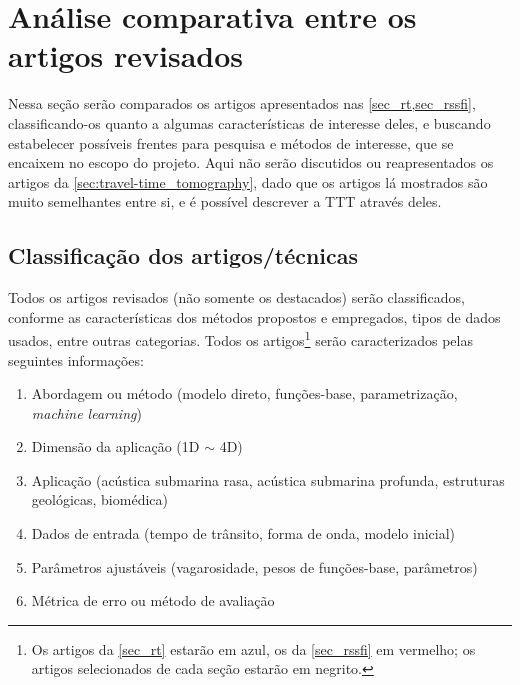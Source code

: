 \section{Análise comparativa entre os artigos revisados}
\label{sec:cp}

Nessa seção serão comparados os artigos apresentados nas \cref{sec_rt,sec_rssfi}, classificando-os quanto a algumas características de interesse deles, e buscando estabelecer possíveis frentes para pesquisa e métodos de interesse, que se encaixem no escopo do projeto. Aqui não serão discutidos ou reapresentados os artigos da \cref{sec:travel-time_tomography}, dado que os artigos lá mostrados são muito semelhantes entre si, e é possível descrever a TTT através deles.

\subsection{Classificação dos artigos/técnicas}
\label{subsec:cp_classif}

Todos os artigos revisados (não somente os destacados) serão classificados, conforme as características dos métodos propostos e empregados, tipos de dados usados, entre outras categorias. Todos os artigos\footnote{Os artigos da \cref{sec_rt} estarão em azul, os da \cref{sec_rssfi} em vermelho; os artigos selecionados de cada seção estarão em negrito.} serão caracterizados pelas seguintes informações:
\begin{enumerate}[itemsep=-1ex, partopsep=0pt]
	\item Abordagem ou método (modelo direto, funções-base, parametrização, \textit{machine learning})
	\item Dimensão da aplicação (1D $\sim$ 4D)
	\item Aplicação (acústica submarina rasa, acústica submarina profunda, estruturas geológicas, biomédica)
	\item Dados de entrada (tempo de trânsito, forma de onda, modelo inicial)
	\item Parâmetros ajustáveis (vagarosidade, pesos de funções-base, parâmetros)
	\item Métrica de erro ou método de avaliação
\end{enumerate}

\begingroup
{}

\renewcommand{\arraystretch}{1.5}

